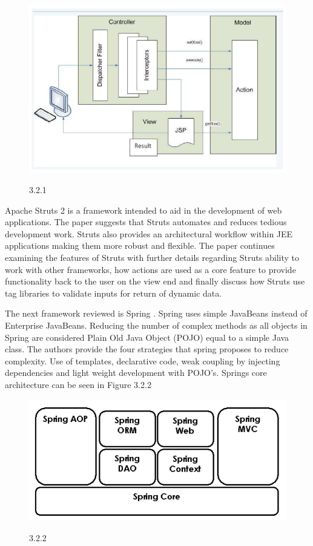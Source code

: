 					\begin{figure}[!htb]
						\includegraphics[width=.8\textwidth]{img3.png}
						\begin{center}
							\figurename{ 3.2.1}
							\end{center}
							\end{figure}
							
							Apache Struts 2 is a framework intended to aid in the development of web applications. The paper suggests that Struts automates and reduces tedious development work. Struts also provides an architectural workflow within JEE applications making them more robust and flexible. The paper continues examining the features of Struts with further details regarding Struts ability to work with other frameworks, how actions are used as a core feature to provide functionality back to the user on the view end and finally discuss how Struts use tag libraries to validate inputs for return of dynamic data. 
							
							The next framework reviewed is Spring \cite{springwalls}. Spring uses simple JavaBeans instead of Enterprise JavaBeans. Reducing the number of complex methods as all objects in Spring are considered Plain Old Java Object (POJO) equal to a simple Java class. The authors provide the four strategies that spring proposes to reduce complexity. Use of templates, declarative code, weak coupling by injecting dependencies and light weight development with POJO’s. Springs core architecture can be seen in Figure 3.2.2
							
							\begin{figure}[!htb]
								\includegraphics[width=.8\textwidth]{img4.png}
								\begin{center}
									\figurename{ 3.2.2}
									\end{center}
									\end{figure}
									
